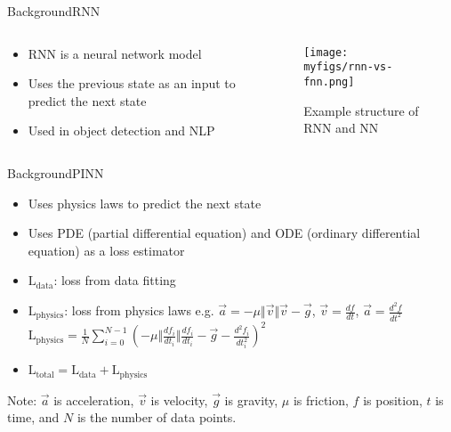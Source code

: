 \documentclass[
	aspectratio=169,	%
	onlytextwidth,		%
	t,					%
	]{beamer}
\begin{document}
\begin{frame}[fragile]{Background}{RNN}
	\begin{columns}
		\begin{column}[T]{.33\textwidth}

			\begin{itemize}
				\item<1-> RNN is a neural network model
				\item<2-> Uses the previous state as an input to predict the next state
				\item<3-> Used in object detection and NLP
			\end{itemize}

		\end{column}

		\begin{column}[T]{.66\textwidth}
			\begin{figure}
				\texttt{[image: myfigs/rnn-vs-fnn.png]}
				\caption{Example structure of RNN and NN~\cite{rnnpic}}
			\end{figure}

		\end{column}

	\end{columns}
\end{frame}

\begin{frame}[fragile]{Background}{PINN}

	\begin{itemize}

		\item Uses physics laws to predict the next state
		\item Uses PDE (partial differential equation) and ODE (ordinary differential equation) as a loss estimator
		\item $\text{L}_{\text{data}}$: loss from data fitting
		\item $\text{L}_{\text{physics}}$: loss from physics laws \newline
			e.g. $\vec{a}= -\mu\Vert\vec{v}\Vert\vec{v} - \vec{g}$, $\vec{v} = \frac{df}{dt}$, $\vec{a}= \frac{d^{2}f}{dt^{2}}$ \newline \vfill
			$\text{L}_{\text{physics}} = \frac{1}{N}\sum_{i=0}^{N-1} (-\mu\Vert\frac{df_{i}}{dt_{i}}\Vert\frac{df_{i}}{dt_{i}} - \vec{g} - \frac{d^{2}f_{i}}{dt_{i}^{2}})^{2}$
		\item $\text{L}_{\text{total}} = \text{L}_{\text{data}} + \text{L}_{\text{physics}}$

	\end{itemize}
	\vfill
	Note: $\vec{a}$ is acceleration, $\vec{v}$ is velocity, $\vec{g}$ is gravity, $\mu$ is friction, $f$ is position, $t$ is time, and $N$ is the number of data points.

\end{frame}
\end{document}
